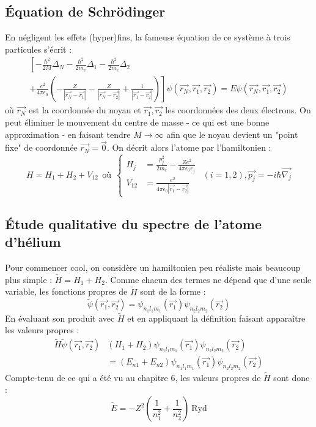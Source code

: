 \documentclass[british,french,11pt, a4paper, openany]{book}
\begin{document}
\subsection{Équation de Schrödinger}
En négligent les effets (hyper)fins, la fameuse équation de ce système à trois 
particules s'écrit :
\begin{multline}
	\left[-\frac{\hbar^2}{2M}\Delta_N-\frac{\hbar^2}{2m_e}\Delta_1-\frac{\hbar^2}{2m_e}\Delta_2\right.\\
	\left.+\frac{e^2}{4\pi\epsilon_0} \left(-\frac{Z}{|\vec{r_N}-\vec{r_1}|}-\frac{Z}{|\vec{r_N}-
		\vec{r_2}|}+\frac{1}{|\vec{r_1}-\vec{r_2}|}\right)\right]\psi(\vec{r_N},\vec{r_1},\vec{r_2}) = 
	E\psi(\vec{r_N},\vec{r_1},\vec{r_2})
\end{multline}
où $\vec{r_N}$ est la coordonnée du noyau et $\vec{r_1},\vec{r_2}$ les coordonnées 
des deux électrons. On peut éliminer le mouvement du centre de masse - ce qui est
une bonne approximation - en faisant tendre $M \rightarrow \infty$ afin que le 
noyau devient un "point fixe" de coordonnée $\vec{r_N}=\vec{0}$. On décrit alors 
l'atome par l'hamiltonien :
\begin{equation}
	H = H_1+H_2+V_{12}\ \ \text{où}\ \ \left\{\begin{array}{ll}
		H_j &= \frac{p_j^2}{2m_e}-\frac{Ze^2}{4\pi\epsilon_0r_j}  \\
		V_{12} &= \frac{e^2}{4\pi\epsilon_0|\vec{r_1}-\vec{r_2}|} 
	\end{array}\right.\ \ (i=1,2), \vec{p_j}=-i\hbar\vec{\nabla_j}
\end{equation}


\subsection{Étude qualitative du spectre de l'atome d'hélium}
Pour commencer cool, on considère un hamiltonien peu réaliste mais beaucoup plus
simple : $\tilde{H} = H_1+H_2$. Comme chacun des termes ne dépend que d'une 
seule variable, les fonctions propres de $\tilde{H}$ sont de la forme :
\begin{equation}
	\tilde{\psi}(\vec{r_1},\vec{r_2}) = \psi_{n_1l_1m_1}(\vec{r_1})\psi_{n_2l_2m_2}(
	\vec{r_2})
\end{equation}
En évaluant son produit avec $\tilde{H}$ et en appliquant la définition faisant
apparaître les valeurs propres : 
\begin{equation}
	\begin{array}{ll}
		\tilde{H}\tilde{\psi}(\vec{r_1},\vec{r_2}) & (H_1+H_2)\psi_{n_1l_1m_1}(\vec{r_1})                                    
		\psi_{n_2l_2m_2}(\vec{r_2})\\
		& = (E_{n1}+E_{n2})\psi_{n_1l_1m_1}(\vec{r_1})\psi_{n_2l_2m_2}(\vec{r_2}) 
	\end{array}
\end{equation}
Compte-tenu de ce qui a été vu au chapitre 6, les valeurs propres de $\tilde{H}$ sont 
donc :
\begin{equation}
	\tilde{E} = -Z^2\left(\frac{1}{n_1^2}+\frac{1}{n_2^2}\right)\ \text{Ryd}
\end{equation}
\end{document}
